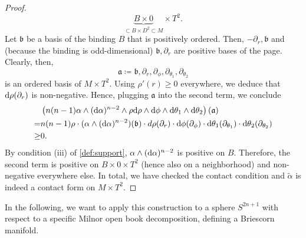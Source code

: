 \begin{proof}
    \[
        \underbrace{B \times 0}_{\subset B \times D^2 \subset M} \times T^2.
    \]
    Let $\mathfrak{b}$ be a basis of the binding $B$ that is positively ordered. Then, $- \partial_r, \mathfrak{b}$ and (because the binding is odd-dimensional) $\mathfrak{b}, \partial_r$ are positive bases of the page. Clearly, then, 
    \[ 
        \mathfrak{a} \coloneqq \mathfrak{b}, \partial_r, \partial_\phi, \partial_{\theta_1}, \partial_{\theta_2}
    \] 
    is an ordered basis of $M\times T^2$.
    Using $\rho'(r) \geq 0$ everywhere, we deduce that $\mathrm{d} \rho(\partial_r)$ is non-negative.
    Hence, plugging $\mathfrak{a}$ into the second term, we conclude
    \begin{align*}
        &\left(n(n-1)\alpha \wedge (\mathrm{d} \alpha)^{n-2}\wedge \rho \mathrm{d}\rho \wedge \mathrm{d} \phi \wedge \mathrm{d} \theta_1 \wedge \mathrm{d} \theta_2\right)(\mathfrak{a})\\
        =& n(n-1) \rho \cdot (\alpha \wedge (\mathrm{d} \alpha)^{n-2})(\mathfrak{b}) \cdot d\rho(\partial_r) \cdot \mathrm{d} \phi(\partial_\phi) \cdot \mathrm{d} \theta_1(\partial_{\theta_1}) \cdot \mathrm{d} \theta_2(\partial_{\theta_2})\\
        \geq& 0.
    \end{align*}
    By condition (iii) of \cref{def:support}, $\alpha \wedge (\mathrm{d} \alpha)^{n-2}$ is positive on $B$. Therefore, the second term is positive on $B \times 0 \times T^2$ (hence also on a neighborhood) and non-negative everywhere else.
    In total, we have checked the contact condition and $\tilde \alpha$ is indeed a contact form on $M\times T^2$.
\end{proof}

In the following, we want to apply this construction to a sphere $S^{2n+1}$
with respect to a specific Milnor open book decomposition, defining a Briescorn manifold.
